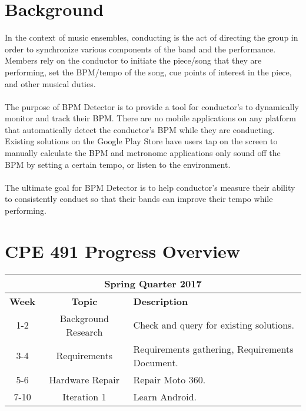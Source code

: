 \documentclass[12pt]{article}
\begin{document}
\section{Background}

In the context of music ensembles, conducting is the act of directing the group in order to synchronize various components of the band and the performance. Members rely on the conductor to initiate the piece/song that they are performing, set the BPM/tempo of the song, cue points of interest in the piece, and other musical duties. 
\\
\\
The purpose of BPM Detector is to provide a tool for conductor's to dynamically monitor and track their BPM. There are no mobile applications on any platform that automatically detect the conductor's BPM while they are conducting. Existing solutions on the Google Play Store have users tap on the screen to manually calculate the BPM and metronome applications only sound off the BPM by setting a certain tempo, or listen to the environment.
\\
\\
The ultimate goal for BPM Detector is to help conductor's measure their ability to consistently conduct so that their bands can improve their tempo while performing.

\section{CPE 491 Progress Overview}
\begin{center}
  \begin{tabular}{ |c|c|p{4in}| } 
  \hline 
  \multicolumn{3}{|c|}{\textbf{Spring Quarter 2017}} \\
  \hline
  \textbf{Week} & \textbf{Topic} & \textbf{Description} \\ 
  \hline
  1-2 & Background Research & Check and query for existing solutions. \\
  \hline
  3-4 & Requirements & Requirements gathering, Requirements Document. \\
  \hline
  5-6 & Hardware Repair & Repair Moto 360. \\
  \hline 
  7-10 & Iteration 1 & Learn Android. \\
  \hline
  \end{tabular}
\end{center}
\end{document}

